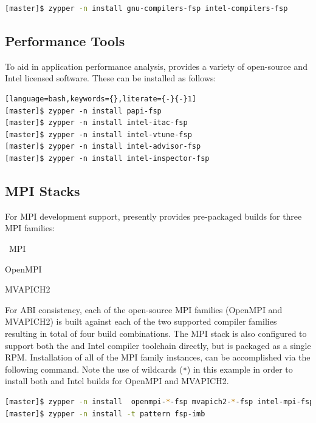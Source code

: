 \documentclass[letterpaper]{article}
\begin{document}
\begin{lstlisting}[language=bash]
[master]$ zypper -n install gnu-compilers-fsp intel-compilers-fsp
\end{lstlisting}

\subsection{Performance Tools}

To aid in application performance analysis, \FSP{} provides a variety of
open-source and Intel licensed software. These can be installed as follows:

\begin{lstlisting}[language=bash,keywords={},literate={-}{-}1]
[master]$ zypper -n install papi-fsp
[master]$ zypper -n install intel-itac-fsp
[master]$ zypper -n install intel-vtune-fsp
[master]$ zypper -n install intel-advisor-fsp
[master]$ zypper -n install intel-inspector-fsp
\end{lstlisting}

\subsection{MPI Stacks} \label{sec:mpi}

For MPI development support, \FSP{} presently provides pre-packaged builds for
three MPI families: 

\begin{itemize*}
\item \Intel{}~MPI
\item OpenMPI
\item MVAPICH2
\end{itemize*}
 For ABI consistency, each of the open-source MPI families (OpenMPI and
 MVAPICH2) is built against each of the two supported compiler families
 resulting in total of four build combinations.  The \Intel{} MPI stack is also
 configured to support both the \GNU{} and Intel compiler toolchain directly, but
 is packaged as a single RPM. Installation of all of the MPI family instances,
 can be accomplished via the following command. Note the use of wildcards
 (\texttt{*}) in this example in order to install both \GNU{} and Intel builds for
 OpenMPI and MVAPICH2.

\begin{lstlisting}[language=bash]
[master]$ zypper -n install  openmpi-*-fsp mvapich2-*-fsp intel-mpi-fsp
[master]$ zypper -n install -t pattern fsp-imb
\end{lstlisting}
\end{document}
